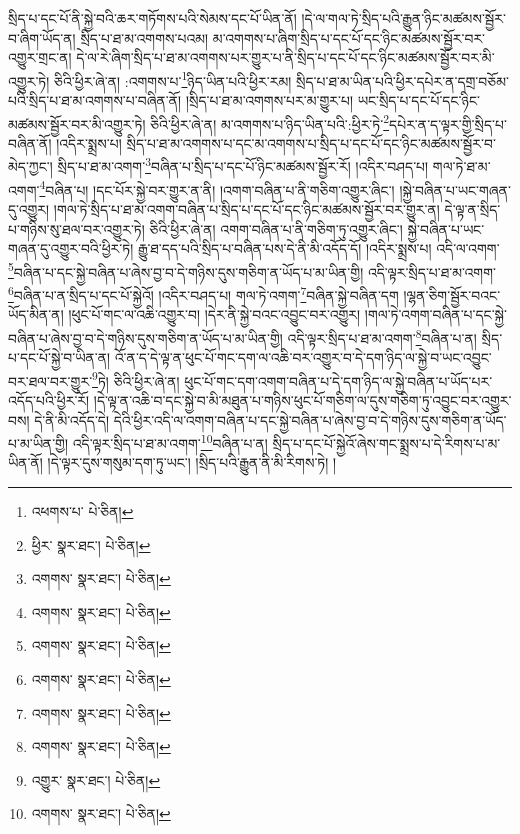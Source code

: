 སྲིད་པ་དང་པོ་ནི་སྐྱེ་བའི་ཆར་གཏོགས་པའི་སེམས་དང་པོ་ཡིན་ནོ། །དེ་ལ་གལ་ཏེ་སྲིད་པའི་རྒྱུན་ཉིང་མཚམས་སྦྱོར་བ་ཞིག་ཡོད་ན། སྲིད་པ་ཐ་མ་འགགས་པའམ། མ་འགགས་པ་ཞིག་སྲིད་པ་དང་པོ་དང་ཉིང་མཚམས་སྦྱོར་བར་འགྱུར་གྲང་ན། དེ་ལ་རེ་ཞིག་སྲིད་པ་ཐ་མ་འགགས་པར་གྱུར་པ་ནི་སྲིད་པ་དང་པོ་དང་ཉིང་མཚམས་སྦྱོར་བར་མི་འགྱུར་ཏེ། ཅིའི་ཕྱིར་ཞེ་ན། :འགགས་པ་\footnote{འཕགས་པ་  པེ་ཅིན། }ཉིད་ཡིན་པའི་ཕྱིར་རམ། སྲིད་པ་ཐ་མ་ཡིན་པའི་ཕྱིར་དཔེར་ན་དགྲ་བཅོམ་པའི་སྲིད་པ་ཐ་མ་འགགས་པ་བཞིན་ནོ། །སྲིད་པ་ཐ་མ་འགགས་པར་མ་གྱུར་པ། ཡང་སྲིད་པ་དང་པོ་དང་ཉིང་མཚམས་སྦྱོར་བར་མི་འགྱུར་ཏེ། ཅིའི་ཕྱིར་ཞེ་ན། མ་འགགས་པ་ཉིད་ཡིན་པའི་:ཕྱིར་ཏེ་\footnote{ཕྱིར་  སྣར་ཐང་།  པེ་ཅིན། }དཔེར་ན་ད་ལྟར་གྱི་སྲིད་པ་བཞིན་ནོ། །འདིར་སྨྲས་པ། སྲིད་པ་ཐ་མ་འགགས་པ་དང་མ་འགགས་པ་སྲིད་པ་དང་པོ་དང་ཉིང་མཚམས་སྦྱོར་བ་མེད་ཀྱང་། སྲིད་པ་ཐ་མ་འགག་\footnote{འགགས་  སྣར་ཐང་།  པེ་ཅིན། }བཞིན་པ་སྲིད་པ་དང་པོ་ཉིང་མཚམས་སྦྱོར་རོ། །འདིར་བཤད་པ། གལ་ཏེ་ཐ་མ་འགག་\footnote{འགགས་  སྣར་ཐང་།  པེ་ཅིན། }བཞིན་པ། །དང་པོར་སྐྱེ་བར་གྱུར་ན་ནི། །འགག་བཞིན་པ་ནི་གཅིག་འགྱུར་ཞིང་། །སྐྱེ་བཞིན་པ་ཡང་གཞན་དུ་འགྱུར། །གལ་ཏེ་སྲིད་པ་ཐ་མ་འགག་བཞིན་པ་སྲིད་པ་དང་པོ་དང་ཉིང་མཚམས་སྦྱོར་བར་གྱུར་ན། དེ་ལྟ་ན་སྲིད་པ་གཉིས་སུ་ཐལ་བར་འགྱུར་ཏེ། ཅིའི་ཕྱིར་ཞེ་ན། འགག་བཞིན་པ་ནི་གཅིག་ཏུ་འགྱུར་ཞིང་། སྐྱེ་བཞིན་པ་ཡང་གཞན་དུ་འགྱུར་བའི་ཕྱིར་ཏེ། རྒྱུ་ཐ་དད་པའི་སྲིད་པ་བཞིན་པས་དེ་ནི་མི་འདོད་དོ། །འདིར་སྨྲས་པ། འདི་ལ་འགག་\footnote{འགགས་  སྣར་ཐང་།  པེ་ཅིན། }བཞིན་པ་དང་སྐྱེ་བཞིན་པ་ཞེས་བྱ་བ་དེ་གཉིས་དུས་གཅིག་ན་ཡོད་པ་མ་ཡིན་གྱི། འདི་ལྟར་སྲིད་པ་ཐ་མ་འགག་\footnote{འགགས་  སྣར་ཐང་།  པེ་ཅིན། }བཞིན་པ་ན་སྲིད་པ་དང་པོ་སྐྱེའོ། །འདིར་བཤད་པ། གལ་ཏེ་འགག་\footnote{འགགས་  སྣར་ཐང་།  པེ་ཅིན། }བཞིན་སྐྱེ་བཞིན་དག །ལྷན་ཅིག་སྦྱོར་བའང་ཡོད་མིན་ན། །ཕུང་པོ་གང་ལ་འཆི་འགྱུར་བ། །དེར་ནི་སྐྱེ་བའང་འབྱུང་བར་འགྱུར། །གལ་ཏེ་འགག་བཞིན་པ་དང་སྐྱེ་བཞིན་པ་ཞེས་བྱ་བ་དེ་གཉིས་དུས་གཅིག་ན་ཡོད་པ་མ་ཡིན་གྱི། འདི་ལྟར་སྲིད་པ་ཐ་མ་འགག་\footnote{འགགས་  སྣར་ཐང་།  པེ་ཅིན། }བཞིན་པ་ན། སྲིད་པ་དང་པོ་སྐྱེ་བ་ཡིན་ན། འོ་ན་ད་དེ་ལྟ་ན་ཕུང་པོ་གང་དག་ལ་འཆི་བར་འགྱུར་བ་དེ་དག་ཉིད་ལ་སྐྱེ་བ་ཡང་འབྱུང་བར་ཐལ་བར་གྱུར་\footnote{འགྱུར་  སྣར་ཐང་།  པེ་ཅིན། }ཏེ། ཅིའི་ཕྱིར་ཞེ་ན། ཕུང་པོ་གང་དག་འགག་བཞིན་པ་དེ་དག་ཉིད་ལ་སྐྱེ་བཞིན་པ་ཡོད་པར་འདོད་པའི་ཕྱིར་རོ། །དེ་ལྟ་ན་འཆི་བ་དང་སྐྱེ་བ་མི་མཐུན་པ་གཉིས་ཕུང་པོ་གཅིག་ལ་དུས་གཅིག་ཏུ་འབྱུང་བར་འགྱུར་བས། དེ་ནི་མི་འདོད་དེ། དེའི་ཕྱིར་འདི་ལ་འགག་བཞིན་པ་དང་སྐྱེ་བཞིན་པ་ཞེས་བྱ་བ་དེ་གཉིས་དུས་གཅིག་ན་ཡོད་པ་མ་ཡིན་གྱི། འདི་ལྟར་སྲིད་པ་ཐ་མ་འགག་\footnote{འགགས་  སྣར་ཐང་།  པེ་ཅིན། }བཞིན་པ་ན། སྲིད་པ་དང་པོ་སྐྱེའོ་ཞེས་གང་སྨྲས་པ་དེ་རིགས་པ་མ་ཡིན་ནོ། །དེ་ལྟར་དུས་གསུམ་དག་ཏུ་ཡང་། །སྲིད་པའི་རྒྱུན་ནི་མི་རིགས་ཏེ། །
